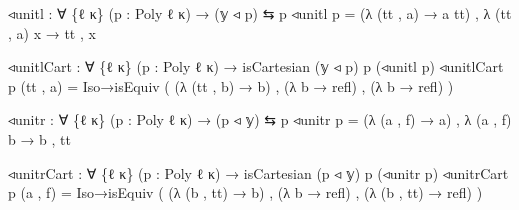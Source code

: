 \documentclass[
  11pt,
  oneside,
  article]{memoir}
\newenvironment{Shaded}{}{}
\newcommand{\NormalTok}[1]{#1}
\newcommand{\OtherTok}[1]{\textcolor[rgb]{0.00,0.44,0.13}{#1}}
\theoremstyle{definition}
\theoremstyle{plain}
\newcommand{\0}{\textsf{0}}
\newcommand{\1}{\tn{\textsf{1}}}
\begin{document}
\begin{Shaded}
\begin{Highlighting}[]
\NormalTok{◃unitl }\OtherTok{:} \OtherTok{∀} \OtherTok{\{}\NormalTok{ℓ κ}\OtherTok{\}} \OtherTok{(}\NormalTok{p }\OtherTok{:}\NormalTok{ Poly ℓ κ}\OtherTok{)} \OtherTok{→} \OtherTok{(}\NormalTok{𝕪 ◃ p}\OtherTok{)}\NormalTok{ ⇆ p}
\NormalTok{◃unitl p }\OtherTok{=} \OtherTok{(λ} \OtherTok{(}\NormalTok{tt , a}\OtherTok{)} \OtherTok{→}\NormalTok{ a tt}\OtherTok{)}\NormalTok{ , }\OtherTok{λ} \OtherTok{(}\NormalTok{tt , a}\OtherTok{)}\NormalTok{ x }\OtherTok{→}\NormalTok{ tt , x}

\NormalTok{◃unitlCart }\OtherTok{:} \OtherTok{∀} \OtherTok{\{}\NormalTok{ℓ κ}\OtherTok{\}} \OtherTok{(}\NormalTok{p }\OtherTok{:}\NormalTok{ Poly ℓ κ}\OtherTok{)} 
             \OtherTok{→}\NormalTok{ isCartesian }\OtherTok{(}\NormalTok{𝕪 ◃ p}\OtherTok{)}\NormalTok{ p }\OtherTok{(}\NormalTok{◃unitl p}\OtherTok{)}
\NormalTok{◃unitlCart p }\OtherTok{(}\NormalTok{tt , a}\OtherTok{)} \OtherTok{=} 
\NormalTok{    Iso→isEquiv }\OtherTok{(} \OtherTok{(λ} \OtherTok{(}\NormalTok{tt , b}\OtherTok{)} \OtherTok{→}\NormalTok{ b}\OtherTok{)} 
\NormalTok{                , }\OtherTok{(λ}\NormalTok{ b\textquotesingle{} }\OtherTok{→}\NormalTok{ refl}\OtherTok{)} 
\NormalTok{                , }\OtherTok{(λ}\NormalTok{ b\textquotesingle{} }\OtherTok{→}\NormalTok{ refl}\OtherTok{)} \OtherTok{)}

\NormalTok{◃unitr }\OtherTok{:} \OtherTok{∀} \OtherTok{\{}\NormalTok{ℓ κ}\OtherTok{\}} \OtherTok{(}\NormalTok{p }\OtherTok{:}\NormalTok{ Poly ℓ κ}\OtherTok{)} \OtherTok{→} \OtherTok{(}\NormalTok{p ◃ 𝕪}\OtherTok{)}\NormalTok{ ⇆ p}
\NormalTok{◃unitr p }\OtherTok{=} \OtherTok{(λ} \OtherTok{(}\NormalTok{a , f}\OtherTok{)} \OtherTok{→}\NormalTok{ a}\OtherTok{)}\NormalTok{ , }\OtherTok{λ} \OtherTok{(}\NormalTok{a , f}\OtherTok{)}\NormalTok{ b }\OtherTok{→}\NormalTok{ b , tt}

\NormalTok{◃unitrCart }\OtherTok{:} \OtherTok{∀} \OtherTok{\{}\NormalTok{ℓ κ}\OtherTok{\}} \OtherTok{(}\NormalTok{p }\OtherTok{:}\NormalTok{ Poly ℓ κ}\OtherTok{)} 
             \OtherTok{→}\NormalTok{ isCartesian }\OtherTok{(}\NormalTok{p ◃ 𝕪}\OtherTok{)}\NormalTok{ p }\OtherTok{(}\NormalTok{◃unitr p}\OtherTok{)}
\NormalTok{◃unitrCart p }\OtherTok{(}\NormalTok{a , f}\OtherTok{)} \OtherTok{=}
\NormalTok{    Iso→isEquiv }\OtherTok{(} \OtherTok{(λ} \OtherTok{(}\NormalTok{b , tt}\OtherTok{)} \OtherTok{→}\NormalTok{ b}\OtherTok{)} 
\NormalTok{                , }\OtherTok{(λ}\NormalTok{ b }\OtherTok{→}\NormalTok{ refl}\OtherTok{)} 
\NormalTok{                , }\OtherTok{(λ} \OtherTok{(}\NormalTok{b , tt}\OtherTok{)} \OtherTok{→}\NormalTok{ refl}\OtherTok{)} \OtherTok{)}
\end{Highlighting}
\end{Shaded}
\end{document}
